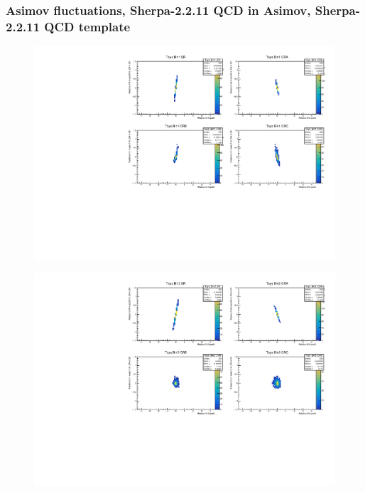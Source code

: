 \subsubsection{\mjj Asimov fluctuations, Sherpa-2.2.11 QCD in Asimov, Sherpa-2.2.11 QCD template}
\begin{figure}[H]
\includegraphics[width=\textwidth]{plots/diffx/instab/linearfx/instabilities_mjj_QCD_Sh2211_Signal_Sh2211_BSDATASTATS_linearfx_newbinning_sherpaasimov_bin1.pdf}
\end{figure}
\begin{figure}[H]
\includegraphics[width=\textwidth]{plots/diffx/instab/linearfx/instabilities_mjj_QCD_Sh2211_Signal_Sh2211_BSDATASTATS_linearfx_newbinning_sherpaasimov_bin2.pdf}
\end{figure}
